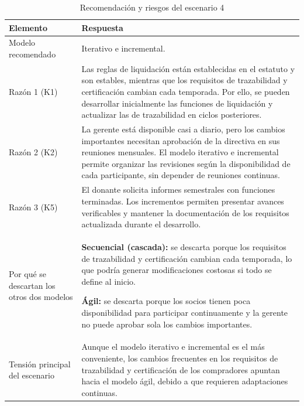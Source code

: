 \documentclass[12pt,a4paper]{article}
\renewcommand{\arraystretch}{1.3}
\begin{document}
\begin{table}[H]
\centering
\caption{Recomendación y riesgos del escenario 4}
\label{tab:recomendacion_escenario4}
\small
\renewcommand{\arraystretch}{1.1}
\setlength{\tabcolsep}{4pt}
\begin{tabularx}{\textwidth}{
    >{\raggedright\arraybackslash}p{3.5cm} Y
}
\toprule
\textbf{Elemento} & \textbf{Respuesta} \\
\midrule

Modelo recomendado
&
Iterativo e incremental.
\\
\midrule

Razón 1 (K1)
&
Las reglas de liquidación están establecidas en el estatuto y son estables, mientras que los requisitos de trazabilidad y certificación cambian cada temporada. Por ello, se pueden desarrollar inicialmente las funciones de liquidación y actualizar las de trazabilidad en ciclos posteriores.
\\
\midrule

Razón 2 (K2)
&
La gerente está disponible casi a diario, pero los cambios importantes necesitan aprobación de la directiva en sus reuniones mensuales. El modelo iterativo e incremental permite organizar las revisiones según la disponibilidad de cada participante, sin depender de reuniones continuas.
\\
\midrule

Razón 3 (K5)
&
El donante solicita informes semestrales con funciones terminadas. Los incrementos permiten presentar avances verificables y mantener la documentación de los requisitos actualizada durante el desarrollo.
\\
\midrule

Por qué se descartan los otros dos modelos
&
\textbf{Secuencial (cascada):} se descarta porque los requisitos de trazabilidad y certificación cambian cada temporada, lo que podría generar modificaciones costosas si todo se define al inicio.

\medskip

\textbf{Ágil:} se descarta porque los socios tienen poca disponibilidad para participar continuamente y la gerente no puede aprobar sola los cambios importantes.
\\
\midrule

Tensión principal del escenario
&
Aunque el modelo iterativo e incremental es el más conveniente, los cambios frecuentes en los requisitos de trazabilidad y certificación de los compradores apuntan hacia el modelo ágil, debido a que requieren adaptaciones continuas.
\\
\midrule


\end{tabularx}
\end{table}
\end{document}

